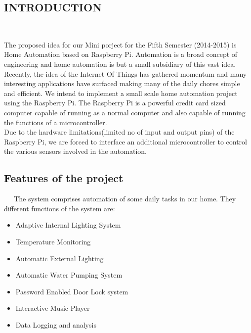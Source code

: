 \documentclass[12pt,a4paper,oneside]{report}
\begin{document}
\maketitle
\thispagestyle{empty}




\begin{onehalfspacing}




\tableofcontents

\chapter{INTRODUCTION}
{$\;\;\;\;$}
  
The proposed idea for our Mini porject for the Fifth Semester (2014-2015) is Home Automation based on Raspberry Pi. Automation is a broad concept of engineering and home automation is but a small subsidiary of this vast idea. Recently, the idea of the Internet Of Things has gathered momentum and many interesting applications have surfaced making many of the daily chores simple and efficient. We intend to implement a small scale home automation project using the Raspberry Pi. The Raspberry Pi is a powerful credit card sized computer capable of running as a normal computer and also capable of running the functions of a microcontroller. 
\\Due to the hardware limitations(limited no of input and output pins) of the Raspberry Pi, we are forced to interface an additional microcontroller to control the various sensors involved in the automation.

\newpage
\section{Features of the project}
{$\;\;\;\;$}
The system comprises automation of some daily tasks in our home. They different functions of the system are:\\
\begin{itemize}
\item Adaptive Internal Lighting System
\item Temperature Monitoring
\item Automatic External Lighting
\item Automatic Water Pumping System
\item Password Enabled Door Lock system
\item Interactive Music Player
\item Data Logging and analysis 
\end{itemize}


\end{onehalfspacing}
\end{document}
